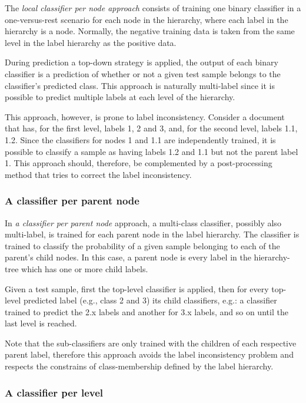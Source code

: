 \documentclass[11pt,a4paper]{article}
\begin{document}
The \textit{local classifier per node approach} consists of training one binary
classifier in a one-versus-rest scenario for each node in the hierarchy, where
each label in the hierarchy is a node. Normally, the negative training data is
taken from the same level in the label hierarchy as the positive data.

During prediction a top-down strategy is applied, the output of each binary
classifier is a prediction of whether or not a given test sample belongs to the
classifier’s predicted class. This approach is naturally multi-label since it is
possible to predict multiple labels at each level of the hierarchy.

This approach, however, is prone to label inconsistency. Consider a document
that has, for the first level, labels 1, 2 and 3, and, for the second level,
labels 1.1, 1.2. Since the classifiers for nodes 1 and 1.1 are independently
trained, it is possible to classify a sample as having labels 1.2 and 1.1 but
not the parent label 1. This approach should, therefore, be complemented by a
post-processing method that tries to correct the label inconsistency.


\subsubsection{A classifier per parent node}

In \textit{a classifier per parent node} approach, a multi-class classifier,
possibly also multi-label, is trained for each parent node in the label
hierarchy. The classifier is trained to classify the probability of a given
sample belonging to each of the parent's child nodes. In this
case, a parent node is every label in the hierarchy-tree which has one or more
child labels.

Given a test sample, first the top-level classifier is applied, then for every
top-level predicted label (e.g., class 2 and 3) its child classifiers, e.g.: a
classifier trained to predict the 2.x labels and another for 3.x labels, and so
on until the last level is reached.

Note that the sub-classifiers are only trained with the children of each
respective parent label, therefore this approach avoids the label inconsistency
problem and respects the constrains of class-membership defined by the label
hierarchy.


\subsubsection{A classifier per level}
\end{document}
